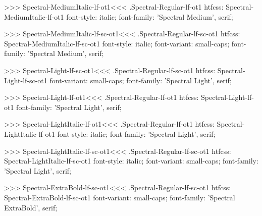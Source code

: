 >>>
\<Spectral-MediumItalic-lf-ot1\><<<
.Spectral-Regular-lf-ot1
htfcss:  Spectral-MediumItalic-lf-ot1  font-style: italic; font-family: 'Spectral Medium', serif;

>>>
\<Spectral-MediumItalic-lf-sc-ot1\><<<
.Spectral-Regular-lf-sc-ot1
htfcss:  Spectral-MediumItalic-lf-sc-ot1  font-style: italic; font-variant: small-caps; font-family: 'Spectral Medium', serif;

>>>
\<Spectral-Light-lf-sc-ot1\><<<
.Spectral-Regular-lf-sc-ot1
htfcss:  Spectral-Light-lf-sc-ot1  font-variant: small-caps; font-family: 'Spectral Light', serif;

>>>
\<Spectral-Light-lf-ot1\><<<
.Spectral-Regular-lf-ot1
htfcss:  Spectral-Light-lf-ot1  font-family: 'Spectral Light', serif;

>>>
\<Spectral-LightItalic-lf-ot1\><<<
.Spectral-Regular-lf-ot1
htfcss:  Spectral-LightItalic-lf-ot1  font-style: italic; font-family: 'Spectral Light', serif;

>>>
\<Spectral-LightItalic-lf-sc-ot1\><<<
.Spectral-Regular-lf-sc-ot1
htfcss:  Spectral-LightItalic-lf-sc-ot1  font-style: italic; font-variant: small-caps; font-family: 'Spectral Light', serif;

>>>
\<Spectral-ExtraBold-lf-sc-ot1\><<<
.Spectral-Regular-lf-sc-ot1
htfcss:  Spectral-ExtraBold-lf-sc-ot1  font-variant: small-caps; font-family: 'Spectral ExtraBold', serif;

